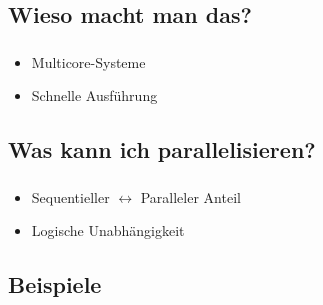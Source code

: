 \subsection{Wieso macht man das?}
\begin{frame}
	\frametitle{\secname}
	\framesubtitle{\subsecname}
	
	\begin{itemize}
		\item Multicore-Systeme
		\item Schnelle Ausführung
			\note[item]{}
	\end{itemize}
\end{frame}

\subsection{Was kann ich parallelisieren?}
\begin{frame}
	\frametitle{\secname}
	\framesubtitle{\subsecname}
	
	\begin{itemize}
		\item Sequentieller $\leftrightarrow$ Paralleler Anteil
			\note[item]{}
		\item Logische Unabhängigkeit
	\end{itemize}
\end{frame}
	

\subsection{Beispiele}
\begin{frame}[fragile]
	\frametitle{\secname}
	\framesubtitle{\subsecname}
	
	
	
\end{frame}


